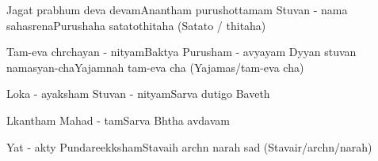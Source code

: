 \documentclass[20pt]{article}
\begin{document}
{Jagat prabhum deva devam}{Anantham purushottamam} 
{Stuvan - nama sahasrena}{Purushaha satatothitaha (Satato / thitaha)}

\newpage
\slokash
{Tam-eva chrchayan - nityam}{Baktya Purusham - avyayam}
{Dyyan stuvan namasyan-cha}{Yajamnah tam-eva cha (Yajamas/tam-eva cha)}


{Loka - ayaksham Stuvan - nityam}{Sarva dutigo Baveth}

{Lkantham Mahad - tam}{Sarva Bhtha avdavam}

{Yat - akty Pundareekksham}{Stavaih archn narah sad (Stavair/archn/narah)}
\end{document}
